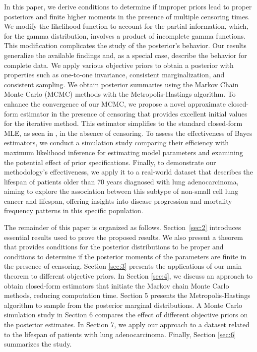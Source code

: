 In this paper, we derive conditions to determine if improper priors lead to proper posteriors and finite higher moments in the presence of multiple censoring times. We modify the likelihood function to account for the partial information, which, for the gamma distribution, involves a product of incomplete gamma functions. This modification complicates the study of the posterior's behavior. Our results generalize the available findings and, as a special case, describe the behavior for complete data. We apply various objective priors to obtain a posterior with properties such as one-to-one invariance, consistent marginalization, and consistent sampling. We obtain posterior summaries using the Markov Chain Monte Carlo (MCMC) methods with the Metropolis-Hastings algorithm. To enhance the convergence of our MCMC, we propose a novel approximate closed-form estimator in the presence of censoring that provides excellent initial values for the iterative method. This estimator simplifies to the standard closed-form MLE, as seen in  \cite{ye2017closed}, in the absence of censoring. To assess the effectiveness of Bayes estimators, we conduct a simulation study comparing their efficiency with maximum likelihood inference for estimating model parameters and examining the potential effect of prior specifications. Finally, to demonstrate our methodology's effectiveness, we apply it to a real-world dataset that describes the lifespan of patients older than 70 years diagnosed with lung adenocarcinoma, aiming to explore the association between this subtype of non-small cell lung cancer and lifespan, offering insights into disease progression and mortality frequency patterns in this specific population.

The remainder of this paper is organized as follows. Section~\ref{sec:2} introduces essential results used to prove the proposed results. We also present a theorem that provides conditions for the posterior distributions to be proper and conditions to determine if the posterior moments of the parameters are finite in the presence of censoring. Section \ref{sec:3} presents the applications of our main theorem to different objective priors. In Section \ref{sec:4}, we discuss an approach to obtain closed-form estimators that initiate the Markov chain Monte Carlo methods, reducing computation time. Section 5 presents the Metropolis-Hastings algorithm to sample from the posterior marginal distributions. A Monte Carlo simulation study in Section 6 compares the effect of different objective priors on the posterior estimates. In Section 7, we apply our approach to a dataset related to the lifespan of patients with lung adenocarcinoma. Finally, Section \ref{sec:6} summarizes the study.

